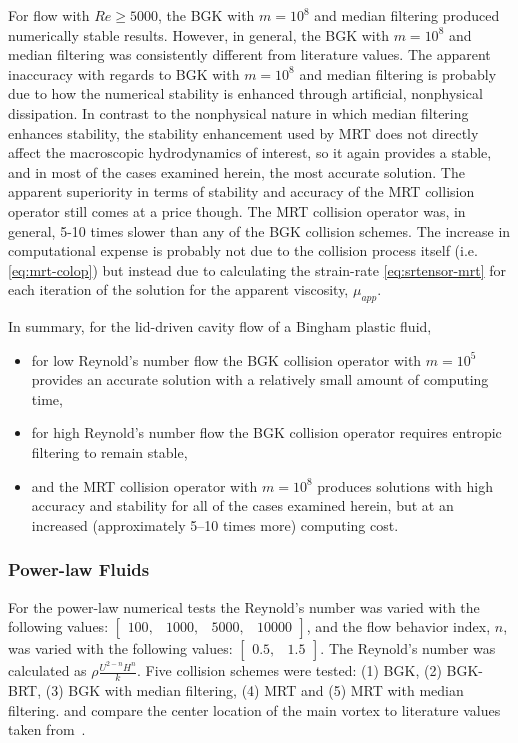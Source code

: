 For flow with $Re \ge 5000$, the BGK with $m = 10^8$ and median filtering produced numerically stable results.
However, in general, the BGK with $m = 10^8$ and median filtering was consistently different from literature values. 
The apparent inaccuracy with regards to BGK with $m = 10^8$ and median filtering is probably due to how the numerical stability is enhanced through artificial, nonphysical dissipation.
In contrast to the nonphysical nature in which median filtering enhances stability, the stability enhancement used by MRT does not directly affect the macroscopic hydrodynamics of interest, so it again provides a stable, and in most of the cases examined herein, the most accurate solution.
The apparent superiority in terms of stability and accuracy of the MRT collision operator still comes at a price though.
The MRT collision operator was, in general, 5-10 times slower than any of the BGK collision schemes.
The increase in computational expense is probably not due to the collision process itself (i.e. \eqref{eq:mrt-colop}) but instead due to calculating the strain-rate \eqref{eq:srtensor-mrt} for each iteration of the solution for the apparent viscosity, $\mu_{app}$.

In summary, for the lid-driven cavity flow of a Bingham plastic fluid, 
\begin{itemize}
    \item for low Reynold's number flow the BGK collision operator with $m = 10^5$ provides an accurate solution with a relatively small amount of computing time,
    \item for high Reynold's number flow the BGK collision operator requires entropic filtering to remain stable,
    \item and the MRT collision operator with $m = 10^8$ produces solutions with high accuracy and stability for all of the cases examined herein, but at an increased (approximately 5--10 times more) computing cost.
\end{itemize} 

\subsubsection{Power-law Fluids}

For the power-law numerical tests the Reynold's number was varied with the following values: $\begin{bmatrix}100,&1000,&5000,&10000\end{bmatrix}$, and the flow behavior index, $n$, was varied with the following values: $\begin{bmatrix}0.5,&1.5\end{bmatrix}$.
The Reynold's number was calculated as $\rho \frac{U^{2-n} H^n}{k}$.
Five collision schemes were tested: (1) BGK, (2) BGK-BRT, (3) BGK with median filtering, (4) MRT and (5) MRT with median filtering.
 and  compare the center location of the main vortex to literature values taken from~\citet{li2014simulation}.

